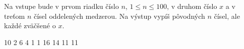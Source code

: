 




Na vstupe bude v prvom riadku číslo $n$, $1\leq n\leq 100$, v druhom číslo $x$ a v treťom $n$ čísel oddelených medzerou.
Na výstup vypíš pôvodných $n$ čísel, ale každé zväčšené o $x$.

10
2 6 4 1 1
 16 14 11 11 
\koniec


